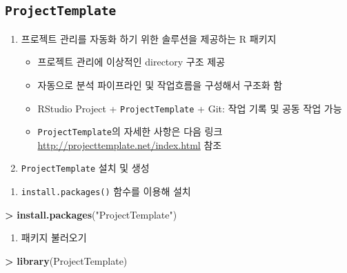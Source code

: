 \documentclass[12pt,a4paper]{book}
\newenvironment{Shaded}{\begin{snugshade}}{\end{snugshade}}
\newcommand{\KeywordTok}[1]{\textcolor[rgb]{0.13,0.29,0.53}{\textbf{#1}}}
\newcommand{\StringTok}[1]{\textcolor[rgb]{0.31,0.60,0.02}{#1}}
\newcommand{\OperatorTok}[1]{\textcolor[rgb]{0.81,0.36,0.00}{\textbf{#1}}}
\newcommand{\NormalTok}[1]{#1}
\providecommand{\tightlist}{%
  \setlength{\itemsep}{0pt}\setlength{\parskip}{0pt}}
\theoremstyle{definition}
\theoremstyle{definition}
\theoremstyle{definition}
\theoremstyle{remark}
\begin{document}
\subsection{\texorpdfstring{\texttt{ProjectTemplate}}{ProjectTemplate}}\label{projecttemplate}

\begin{enumerate}
\def\labelenumi{\arabic{enumi}.}
\tightlist
\item
  프로젝트 관리를 자동화 하기 위한 솔루션을 제공하는 R 패키지

  \begin{itemize}
  \tightlist
  \item
    프로젝트 관리에 이상적인 directory 구조 제공
  \item
    자동으로 분석 파이프라인 및 작업흐름을 구성해서 구조화 함
  \item
    RStudio Project + \texttt{ProjectTemplate} + Git: 작업 기록 및 공동
    작업 가능
  \item
    \texttt{ProjectTemplate}의 자세한 사항은 다음 링크
    \url{http://projecttemplate.net/index.html} 참조
  \end{itemize}
\item
  \texttt{ProjectTemplate} 설치 및 생성
\end{enumerate}

\begin{enumerate}
\def\labelenumi{\arabic{enumi})}
\tightlist
\item
  \texttt{install.packages()} 함수를 이용해 설치
\end{enumerate}

\begin{Shaded}
\begin{Highlighting}[]
\OperatorTok{>}\StringTok{ }\KeywordTok{install.packages}\NormalTok{(}\StringTok{"ProjectTemplate"}\NormalTok{)}
\end{Highlighting}
\end{Shaded}

\begin{enumerate}
\def\labelenumi{\arabic{enumi})}
\setcounter{enumi}{1}
\tightlist
\item
  패키지 불러오기
\end{enumerate}

\begin{Shaded}
\begin{Highlighting}[]
\OperatorTok{>}\StringTok{ }\KeywordTok{library}\NormalTok{(ProjectTemplate)}
\end{Highlighting}
\end{Shaded}
\end{document}
